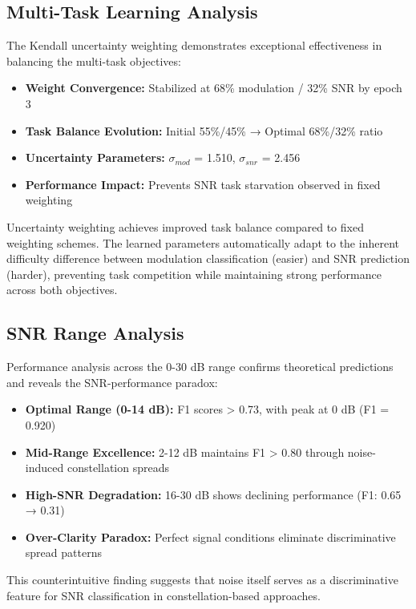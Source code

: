 \documentclass{ELSP}
\begin{document}
\subsection{Multi-Task Learning Analysis}

The Kendall uncertainty weighting demonstrates exceptional effectiveness in balancing the multi-task objectives:

\begin{itemize}
    \item \textbf{Weight Convergence:} Stabilized at 68\% modulation / 32\% SNR by epoch 3
    \item \textbf{Task Balance Evolution:} Initial 55\%/45\% → Optimal 68\%/32\% ratio
    \item \textbf{Uncertainty Parameters:} $\sigma_{mod}$ = 1.510, $\sigma_{snr}$ = 2.456
    \item \textbf{Performance Impact:} Prevents SNR task starvation observed in fixed weighting
\end{itemize}

Uncertainty weighting achieves improved task balance compared to fixed weighting schemes. The learned parameters automatically adapt to the inherent difficulty difference between modulation classification (easier) and SNR prediction (harder), preventing task competition while maintaining strong performance across both objectives.

\subsection{SNR Range Analysis}

Performance analysis across the 0-30 dB range confirms theoretical predictions and reveals the SNR-performance paradox:

\begin{itemize}
    \item \textbf{Optimal Range (0-14 dB):} F1 scores > 0.73, with peak at 0 dB (F1 = 0.920)
    \item \textbf{Mid-Range Excellence:} 2-12 dB maintains F1 > 0.80 through noise-induced constellation spreads
    \item \textbf{High-SNR Degradation:} 16-30 dB shows declining performance (F1: 0.65 → 0.31)
    \item \textbf{Over-Clarity Paradox:} Perfect signal conditions eliminate discriminative spread patterns
\end{itemize}

This counterintuitive finding suggests that noise itself serves as a discriminative feature for SNR classification in constellation-based approaches.
\end{document}
